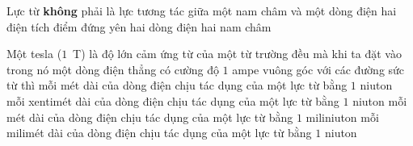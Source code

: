 	\begin{ex}%
		Lực từ \textbf{không} phải là lực tương tác giữa
		\choice
		{một nam châm và một dòng điện}
		{\True hai điện tích điểm đứng yên}
		{hai dòng điện}
		{hai nam châm}
	\end{ex}

	\begin{ex}%
		Một tesla ($1$~T) là độ lớn cảm ứng từ của một từ trường đều mà khi ta đặt vào trong nó một dòng điện thẳng có cường độ $1$ ampe vuông góc với các đường sức từ thì
		\choice
		{\True mỗi mét dài của dòng điện chịu tác dụng của một lực từ bằng $1$ niuton}
		{mỗi xentimét dài của dòng điện chịu tác dụng của một lực từ bằng $1$ niuton}
		{mỗi mét dài của dòng điện chịu tác dụng của một lực từ bằng $1$ miliniuton}
		{mỗi milimét dài của dòng điện chịu tác dụng của một lực từ bằng $1$ niuton}
	\end{ex}

